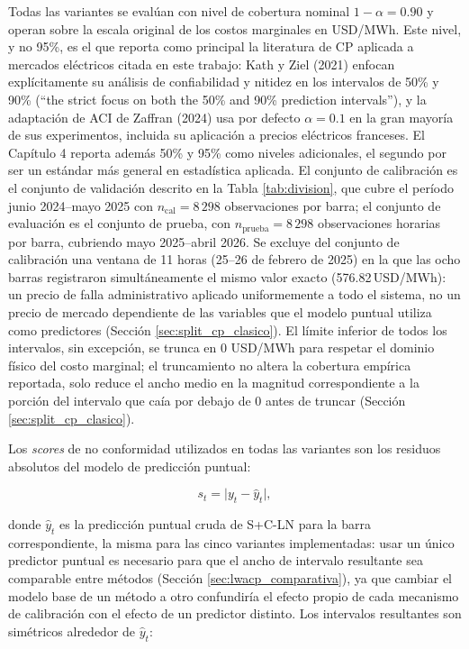 Todas las variantes se evalúan con nivel de cobertura nominal $1 - \alpha = 0.90$ y operan sobre la escala original de los costos marginales en USD/MWh. Este nivel, y no 95\%, es el que reporta como principal la literatura de CP aplicada a mercados eléctricos citada en este trabajo: Kath y Ziel (2021) \cite{KathZiel2021} enfocan explícitamente su análisis de confiabilidad y nitidez en los intervalos de 50\% y 90\% (``the strict focus on both the 50\% and 90\% prediction intervals''), y la adaptación de ACI de Zaffran (2024) \cite{ConformalPrediction} usa por defecto $\alpha = 0.1$ en la gran mayoría de sus experimentos, incluida su aplicación a precios eléctricos franceses. El Capítulo 4 reporta además 50\% y 95\% como niveles adicionales, el segundo por ser un estándar más general en estadística aplicada. El conjunto de calibración es el conjunto de validación descrito en la Tabla \ref{tab:division}, que cubre el período junio 2024--mayo 2025 con $n_{\text{cal}} = 8\,298$ observaciones por barra; el conjunto de evaluación es el conjunto de prueba, con $n_{\text{prueba}} = 8\,298$ observaciones horarias por barra, cubriendo mayo 2025--abril 2026. Se excluye del conjunto de calibración una ventana de 11 horas (25--26 de febrero de 2025) en la que las ocho barras registraron simultáneamente el mismo valor exacto (576.82\,USD/MWh): un precio de falla administrativo aplicado uniformemente a todo el sistema, no un precio de mercado dependiente de las variables que el modelo puntual utiliza como predictores (Sección \ref{sec:split_cp_clasico}). El límite inferior de todos los intervalos, sin excepción, se trunca en 0 USD/MWh para respetar el dominio físico del costo marginal; el truncamiento no altera la cobertura empírica reportada, solo reduce el ancho medio en la magnitud correspondiente a la porción del intervalo que caía por debajo de 0 antes de truncar (Sección \ref{sec:split_cp_clasico}).

Los \textit{scores} de no conformidad utilizados en todas las variantes son los residuos absolutos del modelo de predicción puntual:

\begin{equation}
    s_t = \lvert y_t - \hat{y}_t \rvert,
    \label{eq:nonconformity}
\end{equation}

donde $\hat{y}_t$ es la predicción puntual cruda de S+C-LN para la barra correspondiente, la misma para las cinco variantes implementadas: usar un único predictor puntual es necesario para que el ancho de intervalo resultante sea comparable entre métodos (Sección \ref{sec:lwacp_comparativa}), ya que cambiar el modelo base de un método a otro confundiría el efecto propio de cada mecanismo de calibración con el efecto de un predictor distinto. Los intervalos resultantes son simétricos alrededor de $\hat{y}_t$:

